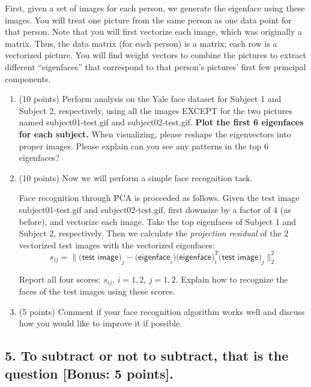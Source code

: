 \documentclass[twoside,10pt]{article}
\begin{document}
First, given a set of images for each person, we generate the eigenface using these images. You will treat one picture from the same person as one data point for that person. Note that you will first vectorize each image, which was originally a matrix. Thus, the data matrix (for each person) is a matrix; each row is a vectorized picture. You will find weight vectors to combine the pictures to extract different ``eigenfaces'' that correspond to that person's pictures' first few principal components. 


\begin{enumerate}

\item (10 points) Perform analysis on the Yale face dataset for Subject 1 and Subject 2, respectively, using all the images EXCEPT for the two pictures named \textsf{subject01-test.gif} and \textsf{subject02-test.gif}. {\bf Plot the first 6 eigenfaces for each subject.} When visualizing, please reshape the eigenvectors into proper images. Please explain can you see any patterns in the top 6 eigenfaces?

\item (10 points) Now we will perform a simple face recognition task. 

Face recognition through PCA is proceeded as follows. Given the test image \textsf{subject01-test.gif} and \textsf{subject02-test.gif}, first downsize by a factor of 4 (as before), and vectorize each image. Take the top eigenfaces of Subject 1 and Subject 2, respectively. Then we calculate the {\it projection residual} of the 2 vectorized test images with the vectorized eigenfaces:
\[s_{ij} = \|\textsf{(test image)}_j - \textsf{(eigenface}_i)\textsf{(eigenface})_i^T \textsf{(test image)}_j\|_2^2\]

Report all four scores: $s_{ij}$, $i = 1, 2$, $j = 1, 2.$ Explain how to recognize the faces of the test images using these scores. 

\item (5 points)
 Comment if your face recognition algorithm works well and discuss how you would like to improve it if possible.

\end{enumerate}


\clearpage


\subsection*{5. To subtract or not to subtract, that is the question [Bonus: 5 points].}
\end{document}
